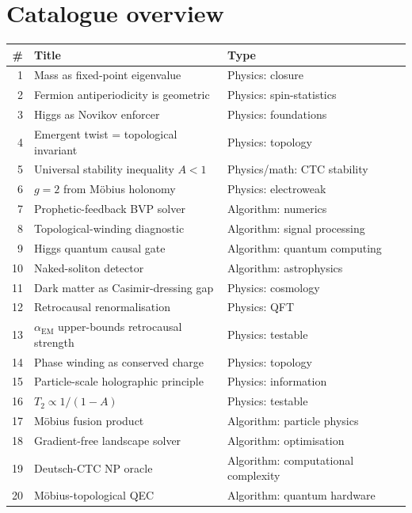 \documentclass[11pt,a4paper]{article}
\theoremstyle{definition}
\newcommand{\contr}{A}
\begin{document}
\section{Catalogue overview}\label{sec:overview}

\begin{small}
\begin{longtable}{@{}rp{}p{}@{}}
\toprule
\# & Title & Type \\
\midrule\endhead
1  & Mass as fixed-point eigenvalue & Physics: closure \\
2  & Fermion antiperiodicity is geometric & Physics: spin-statistics \\
3  & Higgs as Novikov enforcer & Physics: foundations \\
4  & Emergent twist = topological invariant & Physics: topology \\
5  & Universal stability inequality $\contr{<}1$ & Physics/math: CTC stability \\
6  & $g = 2$ from M\"obius holonomy & Physics: electroweak \\
7  & Prophetic-feedback BVP solver & Algorithm: numerics \\
8  & Topological-winding diagnostic & Algorithm: signal processing \\
9  & Higgs quantum causal gate & Algorithm: quantum computing \\
10 & Naked-soliton detector & Algorithm: astrophysics \\
11 & Dark matter as Casimir-dressing gap & Physics: cosmology \\
12 & Retrocausal renormalisation & Physics: QFT \\
13 & $\alpha_{\mathrm{EM}}$ upper-bounds retrocausal strength & Physics: testable \\
14 & Phase winding as conserved charge & Physics: topology \\
15 & Particle-scale holographic principle & Physics: information \\
16 & $T_2 \propto 1/(1-\contr)$ & Physics: testable \\
17 & M\"obius fusion product & Algorithm: particle physics \\
18 & Gradient-free landscape solver & Algorithm: optimisation \\
19 & Deutsch-CTC NP oracle & Algorithm: computational complexity \\
20 & M\"obius-topological QEC & Algorithm: quantum hardware \\

\end{longtable}
\end{small}
\end{document}
